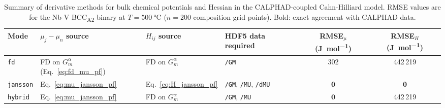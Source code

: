 \begin{table}[htbp]
    \centering
    \caption{%
        Summary of derivative methods for bulk chemical potentials
        and Hessian in the CALPHAD-coupled Cahn-Hilliard model.
        RMSE values are for the Nb-V BCC\textsubscript{A2} binary at
        $T = \SI{500}{\celsius}$ ($n = 200$ composition grid points).
        Bold: exact agreement with CALPHAD data.
    }
    \label{tab:deriv_methods}
    \setlength{\tabcolsep}{5pt}
    \renewcommand{\arraystretch}{1.2}
    \begin{tabularx}{\textwidth}{lllXcc}
        \toprule
        Mode & $\mu_j - \mu_n$ source & $H_{ij}$ source
             & HDF5 data required
             & RMSE$_{\mu}$ (\si{\joule\per\mol})
             & RMSE$_{H}$ (\si{\joule\per\mol}) \\
        \midrule
        \texttt{fd}
            & FD on $G^\alpha_m$ (Eq.~\ref{eq:fd_mu_pf})
            & FD on $G^\alpha_m$
            & \texttt{/GM}
            & 302
            & 442\,219 \\
        \texttt{jansson}
            & Eq.~\ref{eq:mu_jansson_pf}
            & Eq.~\ref{eq:H_jansson_pf}
            & \texttt{/GM}, \texttt{/MU}, \texttt{/dMU}
            & $\boldsymbol{0}$
            & $\boldsymbol{0}$ \\
        \texttt{hybrid}
            & Eq.~\ref{eq:mu_jansson_pf}
            & FD on $G^\alpha_m$
            & \texttt{/GM}, \texttt{/MU}
            & $\boldsymbol{0}$
            & 442\,219 \\
        \bottomrule
    \end{tabularx}
\end{table}

